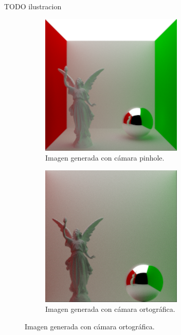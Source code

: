 \documentclass{article}
\begin{document}
TODO ilustracion

\begin{figure}[H]
  \begin{subfigure}[h]{0.4\linewidth}
    \includegraphics[width=\linewidth]{imgs/lucy.png}
    \caption{Imagen generada con cámara pinhole.}
  \end{subfigure}
  \hfill
  \begin{subfigure}[h]{0.4\linewidth}
    \includegraphics[width=\linewidth]{imgs/lucy_o.png}
    \caption{Imagen generada con cámara ortográfica.}
  \end{subfigure}


\end{figure}
\end{document}
